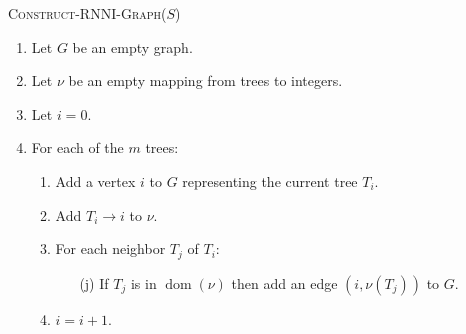 \documentclass[11pt]{amsart}
\theoremstyle{definition}
\newcommand{\rnni}{\mathrm{RNNI}}
\newcommand{\dom}{\operatorname{dom}}
\begin{document}
\medskip

\textsc{Construct-$\rnni$-Graph($S$)}
 \begin{enumerate} [1.]
	\item Let $G$ be an empty graph.
	\item Let $\nu$ be an empty mapping from trees to integers.
	\item Let $i = 0$.
	\item For each of the $m$ trees: \vspace{-0.2em}
		 \begin{enumerate} 
			\item Add a vertex $i$ to $G$ representing the current tree $T_i$.
			\item Add $T_i \rightarrow i$ to $\nu$.
			\item For each neighbor $T_j$ of $T_i$:
				 \begin{enumerate} 
					\item[(j)] If $T_j$ is in $\dom(\nu)$ then add an edge $(i, \nu(T_j))$ to $G$.
				 \end{enumerate} 
		\item $i = i + 1$.
		 \end{enumerate} 
 \end{enumerate} 

\iftoggle{curvatureON}{
\section{Some other spaces}

Several important proposal mechanisms used in phylogenetic Bayesian inference by popular software packages such as BEAST2 \autocite{beast2} favor topological moves or tree moves depending on various conditions.
All tree moves we have been considering so far do not make an explicit distinction between topological changes and branch length changes.
To address this issue\todo{issue?}, we consider the following tree move that explicitly allows distributing the acceptance probability between topological and branch length moves.

{\bf Lazy walk.}
Let $p$ be the laziness probability, that is, we do nothing with probability $1-p$ and distribute the probability $p$ as follows.
We decide first on what type of move we want to perform: choose a topological move with probability $q$ and a length move otherwise, that is, $q \leq p$ and the probability of a length move is $p-q$.
The proposal is rejected if a topological move is impossible.

{\bf tau move.}
Choose a coordinate uniformly at random.
Increase the coordinate by $1$ with probability $p$ and decrease it by $1$ otherwise.
If the coordinate becomes $0$, resolve the multifurcation uniformly at random and set the new coordinate to $1$.
Note that this mechanism does not bound edge lengths from above and favors topological moves when $p<1/2$.
}{}
\end{document}
